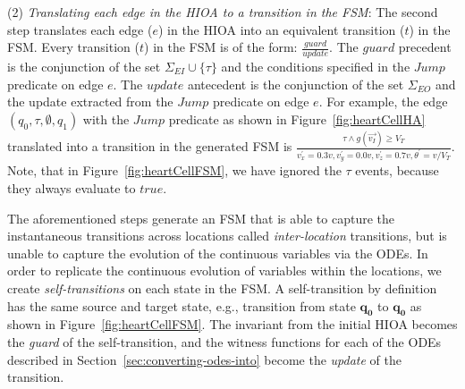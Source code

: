 (2) \textit{Translating each edge in the \ac{HIOA} to a transition in
    the \ac{FSM}}: The second step translates each edge ($e$) in the
  \ac{HIOA} into an equivalent transition ($t$) in the \ac{FSM}. Every
  transition ($t$) in the \ac{FSM} is of the form:
  $\frac{guard}{update}$. The $guard$ precedent is the conjunction of
  the set $\Sigma_{EI} \cup \{\tau\}$ and the conditions specified in
  the $Jump$ predicate on edge $e$. The $update$ antecedent is the
  conjunction of the set $\Sigma_{EO}$ and the update extracted from the $Jump$ 
  predicate on edge $e$. For example, the
  edge $(q_{0}, \tau, \emptyset, q_{1})$ with the $Jump$ predicate as
  shown in Figure~\ref{fig:heartCellHA} translated into a transition in
  the generated \ac{FSM} is
  $\frac{\tau \wedge g(\vec{v_{I}}) \geq V_{T}}{v^{\prime}_{x} = 0.3v,
    v^{\prime}_{y}=0.0v, v^{\prime}_{z}=0.7v, \theta^{\prime}=v/V_{T}}$. Note, 
  that in
  Figure~\ref{fig:heartCellFSM}, we have ignored the $\tau$ events,
  because they always evaluate to $true$.



The aforementioned steps generate an \ac{FSM} that is able to capture
the instantaneous transitions across locations called
\textit{inter-location} transitions, but is unable to capture the
evolution of the continuous variables via the \acp{ODE}. In order to
replicate the continuous evolution of variables within the locations, we
create \textit{self-transitions} on each state in the \ac{FSM}. A
self-transition by definition has the same source and target state,
e.g., transition from state $\mathbf{q_{0}}$ to $\mathbf{q_{0}}$ as shown in
Figure~\ref{fig:heartCellFSM}. The invariant from the initial
\ac{HIOA} becomes the \emph{guard} of the self-transition, and the witness
functions for each of the \acp{ODE} described in
Section~\ref{sec:converting-odes-into} become the \emph{update} of the
transition.

